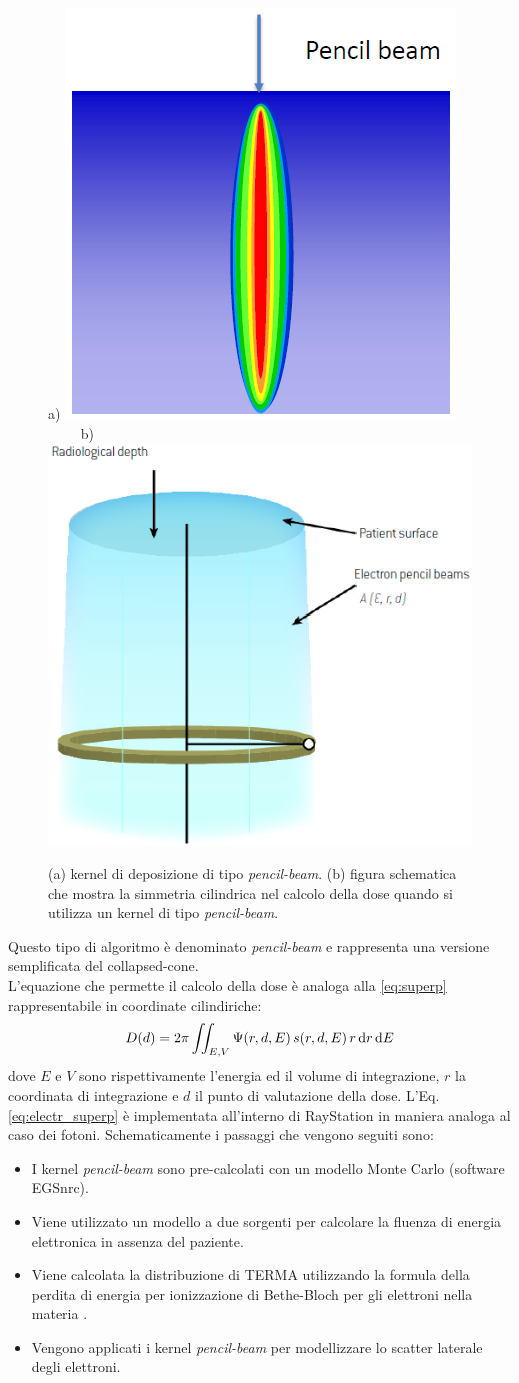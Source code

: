 {\begin{figure}
\centering
a) \includegraphics[width=.35\textwidth]{./cap1/electr_pencil.png}$\qquad$
b) \includegraphics[width=.4\textwidth]{./cap1/electr_pencil_b.png}
\caption{(a) kernel di deposizione di tipo \textit{pencil-beam}. (b) figura schematica che mostra la simmetria cilindrica nel calcolo della dose quando si utilizza un kernel di tipo \textit{pencil-beam}.}
\label{fig:electr_pencil}
\end{figure}


Questo tipo di algoritmo è denominato \textit{pencil-beam} e rappresenta una versione semplificata del collapsed-cone.\\
L'equazione che permette il calcolo della dose è analoga alla \eqref{eq:superp} rappresentabile in coordinate cilindiriche:
\begin{equation}
\label{eq:electr_superp}
D(d) = 2\pi \iint_{E,V} \Psi(r,d,E)\, s(r,d,E)\, r\,\text{d} r \,\text{d} E
\end{equation}
dove $E$ e $V$ sono rispettivamente l'energia ed il volume di integrazione, $r$ la coordinata di integrazione e $d$ il punto di valutazione della dose.
L'Eq.\eqref{eq:electr_superp} è implementata all'interno di RayStation in maniera analoga al caso dei fotoni. Schematicamente i passaggi che vengono seguiti sono:
\begin{itemize}
\item I kernel \textit{pencil-beam} sono pre-calcolati con un modello Monte Carlo (software EGSnrc).
\item Viene utilizzato un modello a due sorgenti per calcolare la fluenza di energia elettronica in assenza del paziente.
\item Viene calcolata la distribuzione di TERMA utilizzando la formula della perdita di energia per ionizzazione di Bethe-Bloch per gli elettroni nella materia \cite{RaySearchLaboratories2014}.
\item Vengono applicati i kernel \textit{pencil-beam} per modellizzare lo scatter laterale degli elettroni.
\end{itemize}

}
